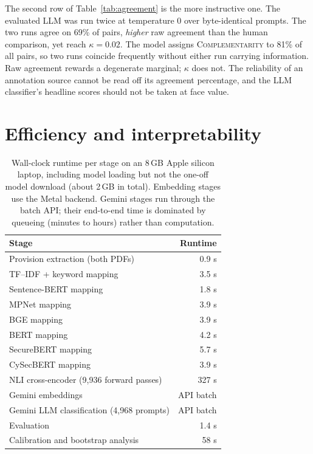 The second row of Table~\ref{tab:agreement} is the more instructive one. The
evaluated LLM was run twice at temperature 0 over byte-identical prompts. The two
runs agree on 69\% of pairs, \emph{higher} raw agreement than the human
comparison, yet reach $\kappa = 0.02$. The model assigns
\textsc{Complementarity} to 81\% of all pairs, so two runs coincide frequently
without either run carrying information. Raw agreement rewards a degenerate
marginal; $\kappa$ does not. The reliability of an annotation source cannot
be read off its agreement percentage, and the LLM classifier's headline
scores should not be taken at face value.

\section{Efficiency and interpretability}\label{sec:efficiency}

\begin{table}[htbp]
\centering
\caption[Wall-clock runtime per stage]{Wall-clock runtime per stage on an
8\,GB Apple silicon laptop, including model loading but not the one-off model
download (about 2\,GB in total). Embedding stages use the Metal backend. Gemini
stages run through the batch API; their end-to-end time is dominated by queueing
(minutes to hours) rather than computation.}
\label{tab:runtime}
\small
\begin{tabular}{lr}
\toprule
Stage & Runtime\\
\midrule
Provision extraction (both PDFs) & 0.9 s\\
TF--IDF + keyword mapping        & 3.5 s\\
Sentence-BERT mapping            & 1.8 s\\
MPNet mapping                    & 3.9 s\\
BGE mapping                      & 3.9 s\\
BERT mapping                     & 4.2 s\\
SecureBERT mapping               & 5.7 s\\
CySecBERT mapping                & 3.9 s\\
NLI cross-encoder (9{,}936 forward passes) & 327 s\\
Gemini embeddings                & API batch\\
Gemini LLM classification (4{,}968 prompts) & API batch\\
Evaluation                       & 1.4 s\\
Calibration and bootstrap analysis & 58 s\\
\bottomrule
\end{tabular}
\end{table}

